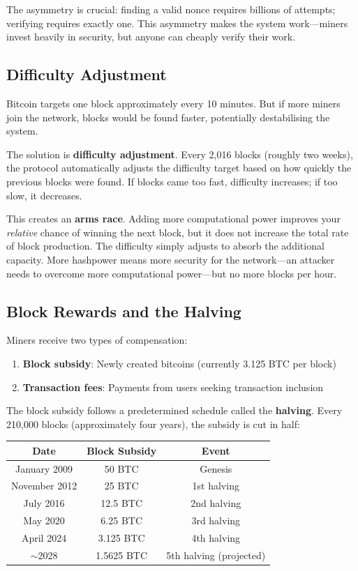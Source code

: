 \documentclass[11pt,a4paper]{article}
\newcommand{\keyword}[1]{\textbf{\textcolor{AccentOrange}{#1}}}
\begin{document}
The asymmetry is crucial: finding a valid nonce requires billions of attempts; verifying requires exactly one. This asymmetry makes the system work---miners invest heavily in security, but anyone can cheaply verify their work.

\subsection{Difficulty Adjustment}

Bitcoin targets one block approximately every 10 minutes. But if more miners join the network, blocks would be found faster, potentially destabilising the system.

The solution is \keyword{difficulty adjustment}. Every 2,016 blocks (roughly two weeks), the protocol automatically adjusts the difficulty target based on how quickly the previous blocks were found. If blocks came too fast, difficulty increases; if too slow, it decreases.

This creates an \keyword{arms race}. Adding more computational power improves your \textit{relative} chance of winning the next block, but it does not increase the total rate of block production. The difficulty simply adjusts to absorb the additional capacity. More hashpower means more security for the network---an attacker needs to overcome more computational power---but no more blocks per hour.

\subsection{Block Rewards and the Halving}

Miners receive two types of compensation:
\begin{enumerate}
    \item \textbf{Block subsidy}: Newly created bitcoins (currently 3.125 BTC per block)
    \item \textbf{Transaction fees}: Payments from users seeking transaction inclusion
\end{enumerate}

The block subsidy follows a predetermined schedule called the \keyword{halving}. Every 210,000 blocks (approximately four years), the subsidy is cut in half:

\begin{center}
\begin{tabular}{ccc}
\toprule
\textbf{Date} & \textbf{Block Subsidy} & \textbf{Event} \\
\midrule
January 2009 & 50 BTC & Genesis \\
November 2012 & 25 BTC & 1st halving \\
July 2016 & 12.5 BTC & 2nd halving \\
May 2020 & 6.25 BTC & 3rd halving \\
April 2024 & 3.125 BTC & 4th halving \\
$\sim$2028 & 1.5625 BTC & 5th halving (projected) \\
\bottomrule
\end{tabular}
\end{center}
\end{document}
